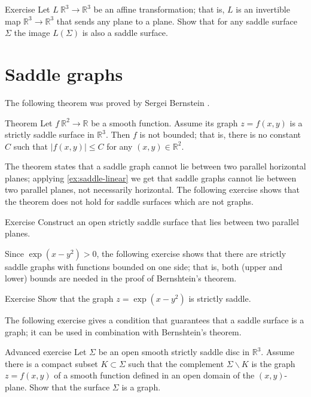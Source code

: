 \begin{thm}{Exercise}\label{ex:saddle-linear}
Let $L\:\mathbb{R}^3\to\mathbb{R}^3$ be an affine transformation; that is, $L$ is an invertible map $\mathbb{R}^3\to\mathbb{R}^3$ that sends any plane to a plane. 
Show that for any saddle surface $\Sigma$ the image $L(\Sigma)$ is also a saddle surface.
\end{thm}


\section{Saddle graphs}

The following theorem was proved by Sergei Bernstein \cite{bernstein}.

\begin{thm}{Theorem}\label{thm:bernshtein}
Let $f\:\mathbb{R}^2\to\mathbb{R}$ be a smooth function.
Assume its graph $z=f(x,y)$ is a strictly saddle surface in $\mathbb{R}^3$.
Then $f$ is not bounded;
that is, there is no constant $C$ such that 
$|f(x,y)|\le C$ for any $(x,y)\in\mathbb{R}^2$.
\end{thm}

The theorem states that a saddle graph cannot lie between two parallel horizontal planes;
applying \ref{ex:saddle-linear} we get that saddle graphs cannot lie between two parallel planes,
not necessarily horizontal.
The following exercise shows that the theorem does not hold for saddle surfaces which are not graphs.


\begin{thm}{Exercise}\label{ex:between-parallels}
Construct an open strictly saddle surface that lies between two parallel planes.
\end{thm}

Since $\exp(x-y^2)>0$,
the following exercise shows that there are strictly saddle graphs with functions bounded on one side; that is, both (upper and lower) bounds are needed in the proof of Bernshtein's theorem.

\begin{thm}{Exercise}\label{ex:one-side-bernshtein}
Show that the graph
$z=\exp(x-y^2)$
is strictly saddle.
\end{thm}

The following exercise gives a condition that guarantees that a saddle surface is a graph;
it can be used in combination with Bernshtein's theorem.

\begin{thm}{Advanced exercise}\label{ex:saddle-graph}
Let $\Sigma$ be an open smooth strictly saddle disc in $\mathbb{R}^3$.
Assume there is a compact subset $K\subset \Sigma$ such that the complement $\Sigma\backslash K$ is the graph $z=f(x,y)$ of a smooth function defined in an open domain of the $(x,y)$-plane.
Show that the surface $\Sigma$ is a graph.
\end{thm}

